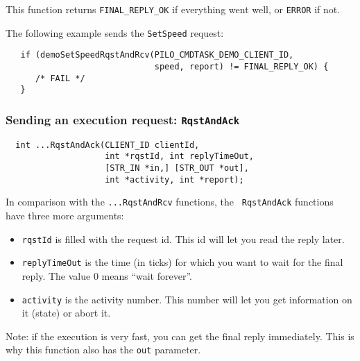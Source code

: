 This function returns {\tt FINAL\_REPLY\_OK}  if everything went well, or
{\tt ERROR} if not.

\bigbreak

The following example sends the {\tt SetSpeed} request:

\begin{center}\begin{cartouche}\small\begin{verbatim}
   if (demoSetSpeedRqstAndRcv(PILO_CMDTASK_DEMO_CLIENT_ID, 
                              speed, report) != FINAL_REPLY_OK) {
      /* FAIL */
   }
\end{verbatim}\end{cartouche}\end{center}


\subsubsection{Sending an execution request: {\tt RqstAndAck}}

\begin{center}\begin{cartouche}\small\begin{verbatim}
  int ...RqstAndAck(CLIENT_ID clientId,
                    int *rqstId, int replyTimeOut,
                    [STR_IN *in,] [STR_OUT *out],
                    int *activity, int *report);
\end{verbatim}\end{cartouche}\end{center}

In comparison with the {\tt ...RqstAndRcv} functions, the {\tt
RqstAndAck} functions have three more arguments:

\begin{itemize}
\item {\tt rqstId} is filled with the request id. This id will let you
read the reply later.

\item {\tt replyTimeOut} is the time (in ticks) for which you want to
wait for the final reply. The value $0$ means ``wait forever''. 

\item {\tt activity} is the activity number. This number will let you get
information on it (state) or abort it.
\end{itemize}

Note: if    the execution is  very   fast, you can   get the  final reply
immediately. This is why this function also has the {\tt out} parameter.

